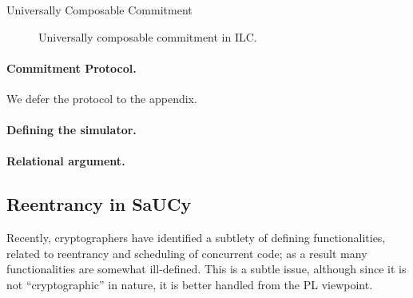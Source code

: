 \begin{algorithm}
\DontPrintSemicolon

\smallskip
{}
\smallskip

\caption{Universally Composable Commitment}
\label{alg:com}
\end{algorithm}

\begin{figure}

\caption{Universally composable commitment in ILC.}
\label{fig:ucc}
\end{figure}

\paragraph{Commitment Protocol.}
We defer the protocol to the appendix.

\paragraph{Defining the simulator.}

\paragraph{Relational argument.}

\subsection{Reentrancy in SaUCy}
\label{subsec:reentrancy}

Recently, cryptographers have identified a subtlety of defining functionalities,
related to reentrancy and scheduling of concurrent code; as a result many
functionalities are somewhat ill-defined.  This is a subtle issue, although
since it is not ``cryptographic'' in nature, it is better handled from the PL
viewpoint.

